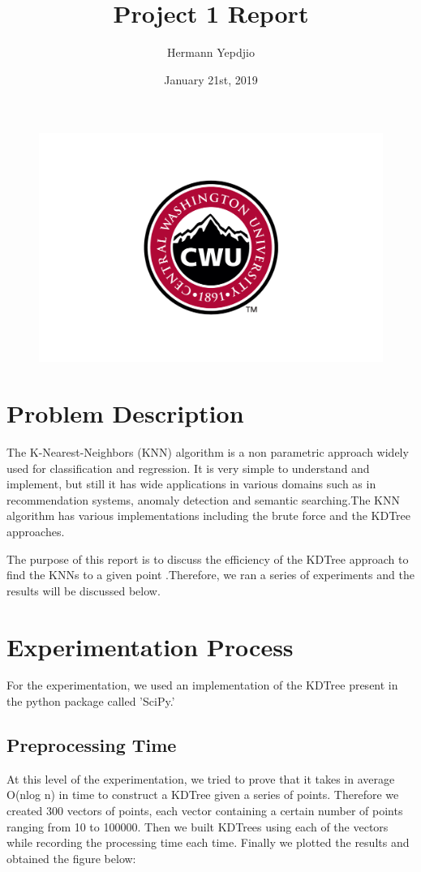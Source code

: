 \documentclass[]{article}
\title{Project 1 Report}
\author{Hermann Yepdjio}
\date{January 21st, 2019}
\begin{document}
	\begin{figure}
		\includegraphics[width=\textwidth]{CWU-Logo.png}
	\end{figure}
\maketitle
\newpage
\tableofcontents
\newpage

\section{Problem Description}
	The K-Nearest-Neighbors (KNN) algorithm is a non parametric approach widely used for classification and regression. It is very simple to understand and implement, but still it has wide applications in various domains such as in recommendation systems, anomaly detection and semantic searching.The KNN algorithm has various implementations including the brute force and the KDTree approaches.
	
	The purpose of this report is to discuss the efficiency of the  KDTree approach to find the KNNs to a given point .Therefore, we ran a series of experiments and the results will be discussed below. 


\section{Experimentation Process}
	For the experimentation, we used an implementation of the KDTree present in the python package called 'SciPy.'
	\subsection{Preprocessing Time}
		At this level of the experimentation, we tried to prove that it takes in average O(nlog n) in time to construct a KDTree given a series of points. Therefore we created 300 vectors of points, each vector containing a certain number of points ranging from 10 to 100000. Then we built KDTrees using each of the vectors while recording the processing time each time. Finally we plotted the results and obtained the figure below:
		
\end{document}
